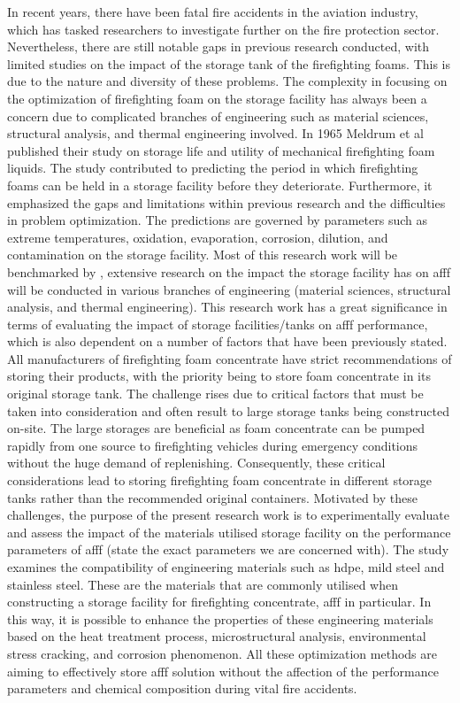 In recent years, there have been fatal fire accidents in the aviation industry, which has tasked researchers to investigate further on the fire protection sector. Nevertheless, there are still notable gaps in previous research conducted, with limited studies on the impact of the storage tank of the firefighting foams. This is due to the nature and diversity of these problems. The complexity in focusing on the optimization of firefighting foam on the storage facility has always been a concern due to complicated branches of engineering such as material sciences, structural analysis, and thermal engineering involved. 
In 1965 Meldrum et al \cite{meldrum1965storage} published their study on storage life and utility of mechanical firefighting foam liquids. The study contributed to predicting the period in which firefighting foams can be held in a storage facility before they deteriorate. Furthermore, it emphasized the gaps and limitations within previous research and the difficulties in problem optimization. The predictions are governed by parameters such as extreme temperatures, oxidation, evaporation, corrosion, dilution, and contamination on the storage facility. Most of this research work will be benchmarked by \cite{meldrum1965storage}, extensive research on the impact the storage facility has on \acrshort{afff} will be conducted in various branches of engineering (material sciences, structural analysis, and thermal engineering).
This research work has a great significance in terms of evaluating the impact of storage facilities/tanks on \acrshort{afff} performance, which is also dependent on a number of factors that have been previously stated. All manufacturers of firefighting foam concentrate have strict recommendations of storing their products, with the priority being to store foam concentrate in its original storage tank. The challenge rises due to critical factors that must be taken into consideration and often result to large storage tanks being constructed on-site. The large storages are beneficial as foam concentrate can be pumped rapidly from one source to firefighting vehicles during emergency conditions without the huge demand of replenishing. Consequently, these critical considerations lead to storing firefighting foam concentrate in different storage tanks rather than the recommended original containers.
Motivated by these challenges, the purpose of the present research work is to experimentally evaluate and assess the impact of the materials utilised storage facility on the performance parameters of \acrshort{afff} (state the exact parameters we are concerned with). The study examines the compatibility of engineering materials such as \acrfull{hdpe}, mild steel and stainless steel. These are the materials that are commonly utilised when constructing a storage facility for firefighting concentrate, \acrshort{afff} in particular. In this way, it is possible to enhance the properties of these engineering materials based on the heat treatment process, microstructural analysis, environmental stress cracking, and corrosion phenomenon. All these optimization methods are aiming to effectively store \acrshort{afff} solution without the affection of the performance parameters and chemical composition during vital fire accidents. 

